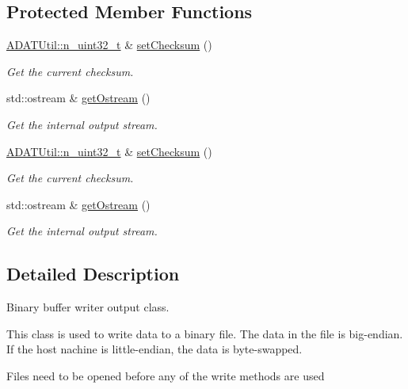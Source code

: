 \subsection*{Protected Member Functions}
\begin{DoxyCompactItemize}
\item 
\mbox{\hyperlink{namespaceADATUtil_ad945a8afa4db2d1f89b731964adae97e}{A\+D\+A\+T\+Util\+::n\+\_\+uint32\+\_\+t}} \& \mbox{\hyperlink{classADATIO_1_1BinaryBufferWriter_af4cc523a862ce29a96f1a813f254360e}{set\+Checksum}} ()
\begin{DoxyCompactList}\small\item\em Get the current checksum. \end{DoxyCompactList}\item 
std\+::ostream \& \mbox{\hyperlink{classADATIO_1_1BinaryBufferWriter_a587ce48f0cf6dd4064edde6db836c0a3}{get\+Ostream}} ()
\begin{DoxyCompactList}\small\item\em Get the internal output stream. \end{DoxyCompactList}\item 
\mbox{\hyperlink{namespaceADATUtil_ad945a8afa4db2d1f89b731964adae97e}{A\+D\+A\+T\+Util\+::n\+\_\+uint32\+\_\+t}} \& \mbox{\hyperlink{classADATIO_1_1BinaryBufferWriter_af4cc523a862ce29a96f1a813f254360e}{set\+Checksum}} ()
\begin{DoxyCompactList}\small\item\em Get the current checksum. \end{DoxyCompactList}\item 
std\+::ostream \& \mbox{\hyperlink{classADATIO_1_1BinaryBufferWriter_a587ce48f0cf6dd4064edde6db836c0a3}{get\+Ostream}} ()
\begin{DoxyCompactList}\small\item\em Get the internal output stream. \end{DoxyCompactList}\end{DoxyCompactItemize}


\subsection{Detailed Description}
Binary buffer writer output class. 

This class is used to write data to a binary file. The data in the file is big-\/endian. If the host nachine is little-\/endian, the data is byte-\/swapped.

Files need to be opened before any of the write methods are used

